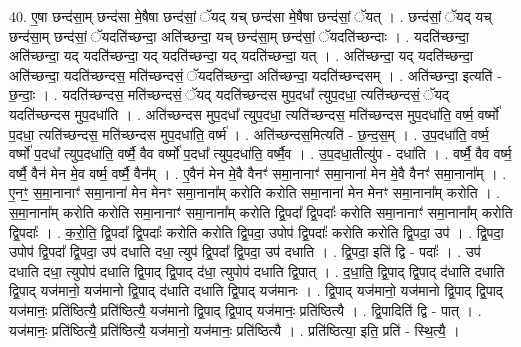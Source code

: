 \documentclass[17pt]{extarticle}
\begin{document}
40. ए॒षा छन्द॑सा॒म् छन्द॑सा मे॒षैषा छन्द॑सां॒ ॅयद् यच् छन्द॑सा मे॒षैषा छन्द॑सां॒ ॅयत् । . छन्द॑सां॒ ॅयद् यच् छन्द॑सा॒म् छन्द॑सां॒ ॅयदति॑च्छन्दा॒ अति॑च्छन्दा॒ यच् छन्द॑सा॒म् छन्द॑सां॒ ॅयदति॑च्छन्दाः । . यदति॑च्छन्दा॒ अति॑च्छन्दा॒ यद् यदति॑च्छन्दा॒ यद् यदति॑च्छन्दा॒ यद् यदति॑च्छन्दा॒ यत् । . अति॑च्छन्दा॒ यद् यदति॑च्छन्दा॒ अति॑च्छन्दा॒ यदति॑च्छन्दस॒ मति॑च्छन्दसं॒ ॅयदति॑च्छन्दा॒ अति॑च्छन्दा॒ यदति॑च्छन्दसम् । . अति॑च्छन्दा॒ इत्यति॑ - छ॒न्दाः॒ । . यदति॑च्छन्दस॒ मति॑च्छन्दसं॒ ॅयद् यदति॑च्छन्दस मुप॒दधा᳚ त्युप॒दधा॒ त्यति॑च्छन्दसं॒ ॅयद् यदति॑च्छन्दस मुप॒दधा॑ति । . अति॑च्छन्दस मुप॒दधा᳚ त्युप॒दधा॒ त्यति॑च्छन्दस॒ मति॑च्छन्दस मुप॒दधा॑ति॒ वर्ष्म॒ वर्ष्मो॑ प॒दधा॒ त्यति॑च्छन्दस॒ मति॑च्छन्दस मुप॒दधा॑ति॒ वर्ष्म॑ । . अति॑च्छन्दस॒मित्यति॑ - छ॒न्द॒स॒म् । . उ॒प॒दधा॑ति॒ वर्ष्म॒ वर्ष्मो॑ प॒दधा᳚ त्युप॒दधा॑ति॒ वर्ष्मै॒ वैव वर्ष्मो॑ प॒दधा᳚ त्युप॒दधा॑ति॒ वर्ष्मै॒व । . उ॒प॒दधा॒तीत्यु॑प - दधा॑ति । . वर्ष्मै॒ वैव वर्ष्म॒ वर्ष्मै॒ वैन॑ मेन मे॒व वर्ष्म॒ वर्ष्मै॒ वैन᳚म् । . ए॒वैन॑ मेन मे॒वै वैनꣳ॑ समा॒नानाꣳ॑ समा॒नाना॑ मेन मे॒वै वैनꣳ॑ समा॒नाना᳚म् । . ए॒नꣳ॒॒ स॒मा॒नानाꣳ॑ समा॒नाना॑ मेन मेनꣳ समा॒नाना᳚म् करोति करोति समा॒नाना॑ मेन मेनꣳ समा॒नाना᳚म् करोति । . स॒मा॒नाना᳚म् करोति करोति समा॒नानाꣳ॑ समा॒नाना᳚म् करोति द्वि॒पदा᳚ द्वि॒पदाः᳚ करोति समा॒नानाꣳ॑ समा॒नाना᳚म् करोति द्वि॒पदाः᳚ । . क॒रो॒ति॒ द्वि॒पदा᳚ द्वि॒पदाः᳚ करोति करोति द्वि॒पदा॒ उपोप॑ द्वि॒पदाः᳚ करोति करोति द्वि॒पदा॒ उप॑ । . द्वि॒पदा॒ उपोप॑ द्वि॒पदा᳚ द्वि॒पदा॒ उप॑ दधाति दधा॒ त्युप॑ द्वि॒पदा᳚ द्वि॒पदा॒ उप॑ दधाति । . द्वि॒पदा॒ इति॑ द्वि - पदाः᳚ । . उप॑ दधाति दधा॒ त्युपोप॑ दधाति द्वि॒पाद् द्वि॒पाद् द॑धा॒ त्युपोप॑ दधाति द्वि॒पात् । . द॒धा॒ति॒ द्वि॒पाद् द्वि॒पाद् द॑धाति दधाति द्वि॒पाद् यज॑मानो॒ यज॑मानो द्वि॒पाद् द॑धाति दधाति द्वि॒पाद् यज॑मानः । . द्वि॒पाद् यज॑मानो॒ यज॑मानो द्वि॒पाद् द्वि॒पाद् यज॑मानः॒ प्रति॑ष्ठित्यै॒ प्रति॑ष्ठित्यै॒ यज॑मानो द्वि॒पाद् द्वि॒पाद् यज॑मानः॒ प्रति॑ष्ठित्यै । . द्वि॒पादिति॑ द्वि - पात् । . यज॑मानः॒ प्रति॑ष्ठित्यै॒ प्रति॑ष्ठित्यै॒ यज॑मानो॒ यज॑मानः॒ प्रति॑ष्ठित्यै । . प्रति॑ष्ठित्या॒ इति॒ प्रति॑ - स्थि॒त्यै॒ । \newline
\pagebreak
{}
\end{document}
